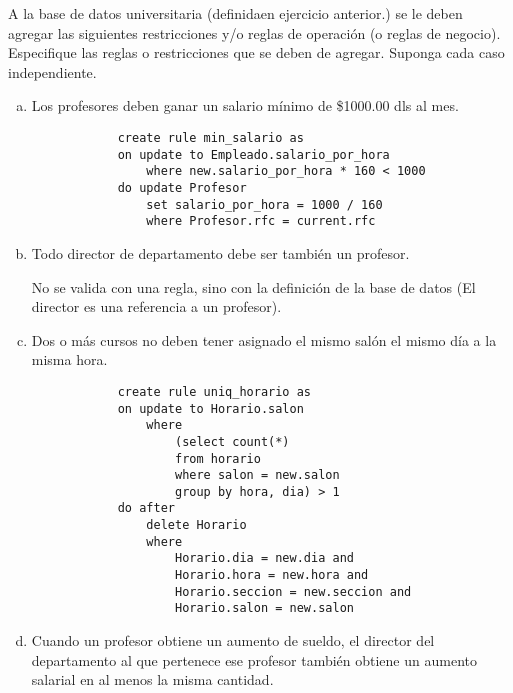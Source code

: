 \documentclass[]{article}
\begin{document}
    \setlength{\headheight}{23.10004pt}
    \addtolength{\topmargin}{-11.10004pt}    

    \noindent
    A la base de datos universitaria (definidaen ejercicio anterior.) se le deben agregar las 
    siguientes restricciones y/o reglas de operación (o reglas de negocio). Especifique las 
    reglas o restricciones que se deben de agregar. Suponga cada caso independiente.

    \begin{enumerate}[a)]
        \item Los profesores deben ganar un salario mínimo de \$1000.00 dls al mes.
        
        \begin{lstlisting}
            create rule min_salario as
            on update to Empleado.salario_por_hora 
                where new.salario_por_hora * 160 < 1000
            do update Profesor
                set salario_por_hora = 1000 / 160
                where Profesor.rfc = current.rfc
        \end{lstlisting}

        \item Todo director de departamento debe ser también un profesor.
        
        No se valida con una regla, sino con la definición de la base de datos (El director es una 
            referencia a un profesor).

        \item Dos o más cursos no deben tener asignado el mismo salón el mismo día a la misma 
            hora.
        
        \begin{lstlisting}
            create rule uniq_horario as
            on update to Horario.salon 
                where 
                    (select count(*) 
                    from horario
                    where salon = new.salon
                    group by hora, dia) > 1
            do after
                delete Horario
                where
                    Horario.dia = new.dia and
                    Horario.hora = new.hora and
                    Horario.seccion = new.seccion and
                    Horario.salon = new.salon
        \end{lstlisting}

        \item Cuando un profesor obtiene un aumento de sueldo, el director del departamento al que 
            pertenece ese profesor también obtiene un aumento salarial en al menos la misma cantidad.


\end{enumerate}
\end{document}
